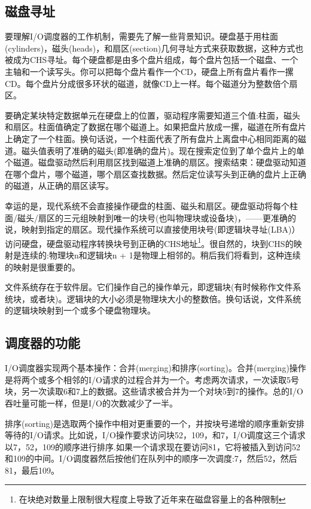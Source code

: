 \subsection{磁盘寻址}

要理解I/O调度器的工作机制，需要先了解一些背景知识。硬盘基于用柱面(cylinders)，磁头(heads)，和扇区(section)几何寻址方式来获取数据，这种方式也被成为CHS寻址。每个硬盘都是由多个盘片组成，每个盘片包括一个磁盘、一个主轴和一个读写头。你可以把每个盘片看作一个CD，硬盘上所有盘片看作一摞CD。每个盘片分成很多环状的磁道，就像CD上一样。每个磁道分为整数倍个扇区。

要确定某块特定数据单元在硬盘上的位置，驱动程序需要知道三个值:柱面，磁头和扇区。柱面值确定了数据在哪个磁道上。如果把盘片放成一摞，磁道在所有盘片上确定了一个柱面。换句话说，一个柱面代表了所有盘片上离盘中心相同距离的磁道。磁头值表明了准确的磁头(即准确的盘片)。现在搜索定位到了单个盘片上的单个磁道。磁盘驱动然后利用扇区找到磁道上准确的扇区。搜索结束：硬盘驱动知道在哪个盘片，哪个磁道，哪个扇区查找数据。然后定位读写头到正确的盘片上正确的磁道，从正确的扇区读写。
     
幸运的是，现代系统不会直接操作硬盘的柱面、磁头和扇区。硬盘驱动将每个柱面/磁头/扇区的三元组映射到唯一的块号(也叫物理块或设备块)，——更准确的说，映射到指定的扇区。现代操作系统可以直接使用块号(即逻辑块寻址(LBA)）访问硬盘，硬盘驱动程序转换块号到正确的CHS地址\footnote[1]{在块绝对数量上限制很大程度上导致了近年来在磁盘容量上的各种限制}。很自然的，块到CHS的映射是连续的:物理块n和逻辑块n + 1是物理上相邻的。稍后我们将看到，这种连续的映射是很重要的。

文件系统存在于软件层。它们操作自己的操作单元，即逻辑块(有时候称作文件系统块，或者块)。逻辑块的大小必须是物理块大小的整数倍。换句话说，文件系统的逻辑块映射到一个或多个硬盘物理块。

\subsection{调度器的功能}

I/O调度器实现两个基本操作：合并(merging)和排序(sorting)。合并(merging)操作是将两个或多个相邻的I/O请求的过程合并为一个。考虑两次请求，一次读取5号块，另一次读取6和7上的数据。这些请求被合并为一个对块5到7的操作。总的I/O吞吐量可能一样，但是I/O的次数减少了一半。
     
排序(sorting)是选取两个操作中相对更重要的一个，并按块号递增的顺序重新安排等待的I/O请求。比如说，I/O操作要求访问块52，109，和7，I/O调度这三个请求以7，52，109的顺序进行排序.如果一个请求现在要访问81，它将被插入到访问52和109的中间。I/O调度器然后按他们在队列中的顺序一次调度:7，然后52，然后81，最后109。

